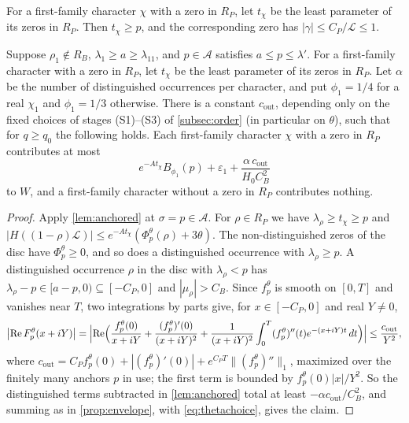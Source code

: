 \documentclass[11pt]{amsart}
\numberwithin{equation}{section}
\theoremstyle{plain}
\theoremstyle{definition}
\theoremstyle{remark}
\newcommand{\LL}{\mathcal{L}}
\renewcommand{\Re}{\operatorname{Re}}
\newcommand{\eps}{\varepsilon}
\newcommand{\1}{\mathbf{1}}
\begin{document}
For a first-family character $\chi$ with a zero in $R_P$, let $t_\chi$ be the least parameter of
its zeros in $R_P$. Then $t_\chi\ge p$, and the corresponding zero has $|\gamma|\le C_P/\LL\le1$.

\begin{proposition}\label{prop:firstoutside}
Suppose $\rho_1\notin R_B$, $\lambda_1\ge a\ge\lambda_{11}$, and
$p\in\mathcal A$ satisfies $a\le p\le\lambda'$. For a first-family character with a
zero in $R_P$, let $t_\chi$ be the least parameter of its zeros in $R_P$.
Let $\alpha$ be the number of distinguished occurrences per character, and put
$\phi_1=1/4$ for a real $\chi_1$ and $\phi_1=1/3$ otherwise.
There is a constant $c_{\mathrm{out}}$, depending only on the fixed choices of stages (S1)--(S3) of
\cref{subsec:order} (in particular on $\theta$), such that for $q\ge q_0$ the following holds. Each
first-family character $\chi$ with a zero in $R_P$ contributes at most
\[
  e^{-At_\chi}B_{\phi_1}(p)+\eps_1+\frac{\alpha\,c_{\mathrm{out}}}{H_0C_B^2}
\]
to $W$, and a first-family character without a zero in $R_P$ contributes nothing.
\end{proposition}

\begin{proof}
Apply \cref{lem:anchored} at $\sigma=p\in\mathcal A$. For $\rho\in R_P$ we have $\lambda_\rho\ge t_\chi\ge p$ and
$|H((1-\rho)\LL)|\le e^{-At_\chi}(\Phi^\theta_p(\rho)+3\theta)$. The non-distinguished zeros of the disc
have $\Phi^\theta_p\ge0$, and so does a distinguished occurrence with $\lambda_\rho\ge p$. A distinguished
occurrence $\rho$ in the disc with $\lambda_\rho<p$ has $\lambda_\rho-p\in[a-p,0)\subseteq[-C_P,0]$ and
$|\mu_\rho|>C_B$. Since $f^\theta_p$ is smooth on $[0,T]$ and vanishes near $T$, two integrations
by parts give, for $x\in[-C_P,0]$ and real $Y\ne0$,
\[
  \bigl|\Re F^\theta_p(x+iY)\bigr|=\Bigl|\Re\Bigl(\frac{f^\theta_p(0)}{x+iY}+\frac{(f^\theta_p)'(0)}{(x+iY)^2}
  +\frac1{(x+iY)^2}\int_0^T(f^\theta_p)''(t)e^{-(x+iY)t}\,dt\Bigr)\Bigr|\le\frac{c_{\mathrm{out}}}{Y^2},
\]
where $c_{\mathrm{out}}=C_Pf^\theta_p(0)+|(f^\theta_p)'(0)|+e^{C_PT}\|(f^\theta_p)''\|_1$, maximized over the
finitely many anchors $p$ in use; the first term is bounded by $f^\theta_p(0)|x|/Y^2$. So the
distinguished terms subtracted in \cref{lem:anchored} total at least $-\alpha c_{\mathrm{out}}/C_B^2$,
and summing as in \cref{prop:envelope}, with \eqref{eq:thetachoice}, gives the claim.
\end{proof}
\end{document}
